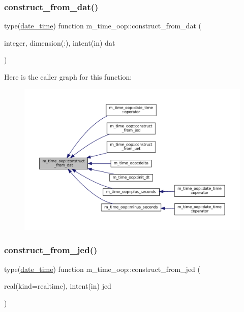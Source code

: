 \subsubsection{\texorpdfstring{construct\+\_\+from\+\_\+dat()}{construct\_from\_dat()}}
{\footnotesize\ttfamily type(\mbox{\hyperlink{structm__time__oop_1_1date__time}{date\+\_\+time}}) function m\+\_\+time\+\_\+oop\+::construct\+\_\+from\+\_\+dat (\begin{DoxyParamCaption}\item[{integer, dimension(\+:), intent(in)}]{dat }\end{DoxyParamCaption})\hspace{0.3cm}{\ttfamily [private]}}

Here is the caller graph for this function\+:\nopagebreak
\begin{figure}[H]
\begin{center}
\leavevmode
\includegraphics[width=350pt]{namespacem__time__oop_ae43c4146d74863b5aee027ebc0103f48_icgraph}
\end{center}
\end{figure}
\mbox{\label{namespacem__time__oop_ac7d9aa1885c2b8df613541be8a147064}} 
\subsubsection{\texorpdfstring{construct\+\_\+from\+\_\+jed()}{construct\_from\_jed()}}
{\footnotesize\ttfamily type(\mbox{\hyperlink{structm__time__oop_1_1date__time}{date\+\_\+time}}) function m\+\_\+time\+\_\+oop\+::construct\+\_\+from\+\_\+jed (\begin{DoxyParamCaption}\item[{real(kind=realtime), intent(in)}]{jed }\end{DoxyParamCaption})\hspace{0.3cm}{\ttfamily [private]}}



